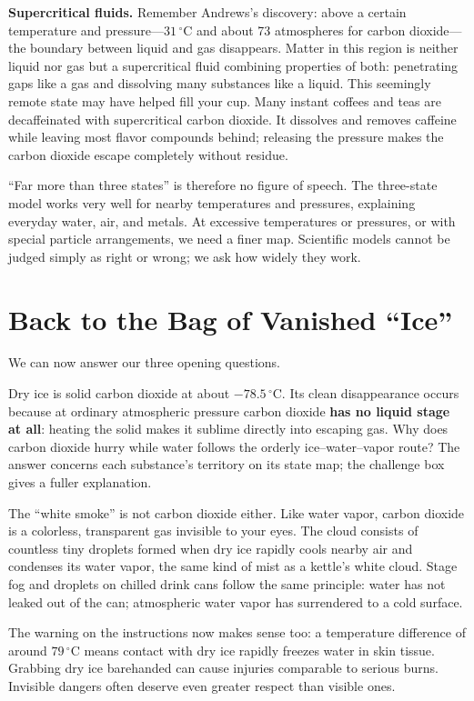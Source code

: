 \textbf{Supercritical fluids.} Remember Andrews's discovery: above a certain temperature and pressure---$31\,^{\circ}\mathrm{C}$ and about 73 atmospheres for carbon dioxide---the boundary between liquid and gas disappears. Matter in this region is neither liquid nor gas but a supercritical fluid combining properties of both: penetrating gaps like a gas and dissolving many substances like a liquid. This seemingly remote state may have helped fill your cup. Many instant coffees and teas are decaffeinated with supercritical carbon dioxide. It dissolves and removes caffeine while leaving most flavor compounds behind; releasing the pressure makes the carbon dioxide escape completely without residue.

``Far more than three states'' is therefore no figure of speech. The three-state model works very well for nearby temperatures and pressures, explaining everyday water, air, and metals. At excessive temperatures or pressures, or with special particle arrangements, we need a finer map. Scientific models cannot be judged simply as right or wrong; we ask how widely they work.

\section{Back to the Bag of Vanished ``Ice''}

We can now answer our three opening questions.

Dry ice is solid carbon dioxide at about $-78.5\,^{\circ}\mathrm{C}$. Its clean disappearance occurs because at ordinary atmospheric pressure carbon dioxide \textbf{has no liquid stage at all}: heating the solid makes it sublime directly into escaping gas. Why does carbon dioxide hurry while water follows the orderly ice--water--vapor route? The answer concerns each substance's territory on its state map; the challenge box gives a fuller explanation.

The ``white smoke'' is not carbon dioxide either. Like water vapor, carbon dioxide is a colorless, transparent gas invisible to your eyes. The cloud consists of countless tiny droplets formed when dry ice rapidly cools nearby air and condenses its water vapor, the same kind of mist as a kettle's white cloud. Stage fog and droplets on chilled drink cans follow the same principle: water has not leaked out of the can; atmospheric water vapor has surrendered to a cold surface.

The warning on the instructions now makes sense too: a temperature difference of around $79\,^{\circ}\mathrm{C}$ means contact with dry ice rapidly freezes water in skin tissue. Grabbing dry ice barehanded can cause injuries comparable to serious burns. Invisible dangers often deserve even greater respect than visible ones.

